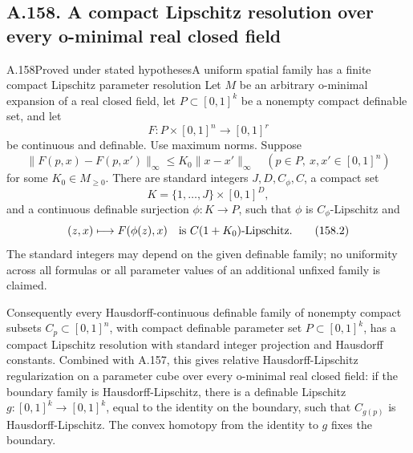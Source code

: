 \subsection{A.158. A compact Lipschitz resolution over every o-minimal real closed field}

\begin{saresult}{A.158}{Proved under stated hypotheses}{A uniform spatial family has a finite compact Lipschitz parameter resolution}
Let \(M\) be an arbitrary o-minimal expansion of a real closed field, let
\(P\subset[0,1]^k\) be a nonempty compact definable set, and let
\[
 F:P\times[0,1]^n\longrightarrow[0,1]^r
\]
be continuous and definable. Use maximum norms. Suppose
\[
 \|F(p,x)-F(p,x')\|_\infty\le K_0\|x-x'\|_\infty
 \quad(p\in P,\ x,x'\in[0,1]^n)
 \tag{158.1}
\]
for some \(K_0\in M_{\ge0}\). There are standard integers
\(J,D,C_\phi,C\), a compact set
\[
 K=\{1,\ldots,J\}\times[0,1]^D,
\]
and a continuous definable surjection \(\phi:K\to P\), such that
\(\phi\) is \(C_\phi\)-Lipschitz and
\[
 (z,x)\longmapsto F(\phi(z),x)
 \quad\hbox{is }C(1+K_0)\hbox{-Lipschitz}.
 \tag{158.2}
\]
The standard integers may depend on the given definable family; no
uniformity across all formulas or all parameter values of an additional
unfixed family is claimed.

Consequently every Hausdorff-continuous definable family of nonempty
compact subsets \(C_p\subset[0,1]^n\), with compact definable parameter
set \(P\subset[0,1]^k\), has a compact Lipschitz resolution with standard
integer projection and Hausdorff constants. Combined with A.157, this
gives relative Hausdorff-Lipschitz regularization on a parameter cube
over every o-minimal real closed field: if the boundary family is
Hausdorff-Lipschitz, there is a definable Lipschitz \(g:[0,1]^k\to[0,1]^k\),
equal to the identity on the boundary, such that \(C_{g(p)}\) is
Hausdorff-Lipschitz. The convex homotopy from the identity to \(g\) fixes
the boundary.
\end{saresult}

